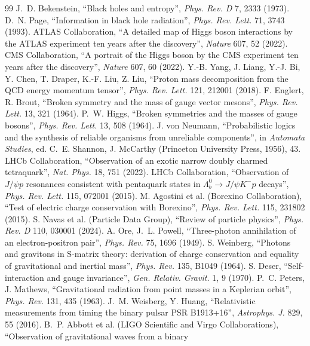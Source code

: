 \documentclass[11pt,a4paper]{article}
\theoremstyle{definition}
\theoremstyle{remark}
\begin{document}
\begin{thebibliography}{99}
 J.~D. Bekenstein, ``Black holes and entropy'', \emph{Phys. Rev. D} 7, 2333 (1973).
 D.~N. Page, ``Information in black hole radiation'', \emph{Phys. Rev. Lett.} 71, 3743 (1993).
 ATLAS Collaboration, ``A detailed map of Higgs boson interactions by the ATLAS experiment ten years after the
discovery'', \emph{Nature} 607, 52 (2022).
 CMS Collaboration, ``A portrait of the Higgs boson by the CMS experiment ten years after the discovery'', \emph{Nature}
607, 60 (2022).
 Y.-B. Yang, J. Liang, Y.-J. Bi, Y. Chen, T. Draper, K.-F. Liu, Z. Liu, ``Proton mass decomposition from the QCD energy
momentum tensor'', \emph{Phys. Rev. Lett.} 121, 212001 (2018).
 F. Englert, R. Brout, ``Broken symmetry and the mass of gauge vector mesons'', \emph{Phys. Rev. Lett.} 13, 321 (1964).
 P.~W. Higgs, ``Broken symmetries and the masses of gauge bosons'', \emph{Phys. Rev. Lett.} 13, 508 (1964).
 J. von Neumann, ``Probabilistic logics and the synthesis of reliable organisms from unreliable components'', in
\emph{Automata Studies}, ed. C.~E. Shannon, J. McCarthy (Princeton University Press, 1956), 43.
 LHCb Collaboration, ``Observation of an exotic narrow doubly charmed tetraquark'', \emph{Nat. Phys.} 18, 751 (2022).
 LHCb Collaboration, ``Observation of $J/\psi p$ resonances consistent with pentaquark states in $\Lambda_b^0\to J/\psi
K^-p$ decays'', \emph{Phys. Rev. Lett.} 115, 072001 (2015).
 M. Agostini et al. (Borexino Collaboration), ``Test of electric charge conservation with Borexino'', \emph{Phys. Rev.
Lett.} 115, 231802 (2015).
 S. Navas et al. (Particle Data Group), ``Review of particle physics'', \emph{Phys. Rev. D} 110, 030001 (2024).
 A. Ore, J.~L. Powell, ``Three-photon annihilation of an electron-positron pair'', \emph{Phys. Rev.} 75, 1696 (1949).
 S. Weinberg, ``Photons and gravitons in S-matrix theory: derivation of charge conservation and equality of
gravitational and inertial mass'', \emph{Phys. Rev.} 135, B1049 (1964).
 S. Deser, ``Self-interaction and gauge invariance'', \emph{Gen. Relativ. Gravit.} 1, 9 (1970).
 P.~C. Peters, J. Mathews, ``Gravitational radiation from point masses in a Keplerian orbit'', \emph{Phys. Rev.} 131, 435
(1963).
 J.~M. Weisberg, Y. Huang, ``Relativistic measurements from timing the binary pulsar PSR B1913+16'', \emph{Astrophys. J.}
829, 55 (2016).
 B.~P. Abbott et al. (LIGO Scientific and Virgo Collaborations), ``Observation of gravitational waves from a binary

\end{thebibliography}
\end{document}
